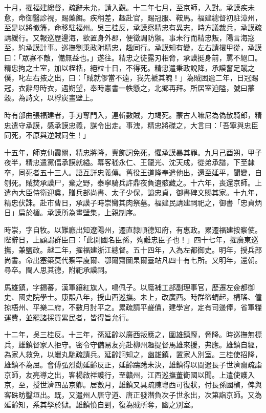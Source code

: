\begin{pinyinscope}
十月，擢福建總督，疏辭未允，請入覲。十二年七月，至京師，入對。承謨疾未愈，命御醫診視，賜藥餌。疾稍差，趣赴官，賜冠服、鞍馬。福建總督初駐漳州，至是以將撤籓，命移駐福州。吳三桂反，承謨察精忠有異志，時方議裁兵，承謨疏請緩行。又報巡歷邊海，欲置身外郡，便徵調防禦。事未行而精忠叛，陽言海寇至，約承謨計事。巡撫劉秉政附精忠，趣同行。承謨知有變，左右請擐甲從，承謨曰：「眾寡不敵，備無益也。」遂往。精忠之徒露刃相脅，承謨挺身前，罵不絕口。精忠拘之土室，加以桎梏，絕粒十日，不得死。精忠遣秉政說降，承謨奮足蹴之僕，叱左右掖之出，曰：「賊就僇當不遠，我先褫其魄！」為賊困逾二年，日冠賜冠，衣辭母時衣，遇朔望，奉時憲書一帙懸之，北鄉再拜。所居室迫隘，號曰蒙穀。為詩文，以桴炭畫壁上。

時有部曲張福建者，手刃奪門入，連斬數賊，力竭死。蒙古人嘛尼為偽散騎郎，精忠遣守承謨，感承謨忠義，謀令出走。事洩，精忠將磔之，大言曰：「吾寧與忠臣同死，不原與逆賊同生！」

十五年，師克仙霞關，精忠將降，冀飾詞免死，懼承謨暴其罪。九月己酉朔，甲子夜半，精忠遣黨偪承謨就縊。幕客嵇永仁、王龍光、沈天成，從弟承譜，下至隸卒，同死者五十三人。語互詳忠義傳。舊役王道隆奉遣他出，還至延平，聞變，自刎死。賊焚承謨尸，棄之野，泰寧騎兵許鼎夜負遺骸藏之。十六年，喪還京師。上遣內大臣侍衛迎奠，贈兵部尚書、太子少保，謚忠貞，御書碑文賜其家。十九年，精忠伏誅。赴市曹日，承謨子時崇臠其肉祭墓。福建民請建祠祀之，御書「忠貞炳日」扁於楣。承謨所為畫壁集，上親制序。

時崇，字自牧。以難廕出知遼陽州，遷直隸順德知府，有惠政。累遷福建按察使。陛辭日，上顧謂群臣曰：「此開國名臣孫，殉難忠臣子也！」四十七年，擢廣東巡撫，兼鹽政。越二年，擢福建浙江總督。五十四年，入為左都御史。明年，授兵部尚書。命出塞築莫代察罕廋爾、鄂爾齋圖杲爾臺站凡四十有七所。又明年，還朝。尋卒。閩人思其德，附祀承謨祠。

馬雄鎮，字錫蕃，漢軍鑲紅旗人，鳴佩子。以廕補工部副理事官，歷遷左僉都御史、國史院學士。康熙八年，授山西巡撫。未上，改廣西。時群盜蝟起，構瑤、僮掠梧州、平樂二府，不數月討平之。累疏請平鹺價，建學宮，定有司邊俸，省軍糧運費，並罷諸採買累民者，皆得旨允行。

十二年，吳三桂反。十三年，孫延齡以廣西叛應之，圍雄鎮廨，脅降。時巡撫無標兵，雄鎮督家人拒守。密令守備易友亮赴柳州趣提督馬雄來援，弗應。雄鎮自經，為家人救免，以蠟丸馳疏請兵。延齡詗知之，幽雄鎮，置家人別室。三桂使招降，雄鎮不為屈。會傅弘烈勸延齡反正，延齡躊躇未決，雄鎮得以間遣長子世濟齎疏詣京師，友亮導之出，客楊啟祥護行，至贛州，江西巡撫董衛國以聞。上遣使護入京，至，授世濟四品京卿。居數月，雄鎮又具疏陳粵西可復狀，付長孫國楨，俾與客硃昉鑿垣出。既，又遣州人唐守道、唐正發潛負次子世永出，次第詣京師。又為延齡知，系其孥於獄。雄鎮憤自剄，復為賊所奪，幽之別室。


\end{pinyinscope}

